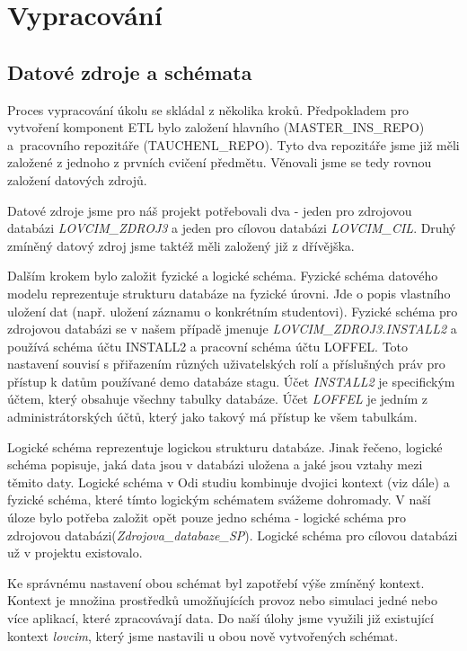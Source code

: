 \section{Vypracování}

 \subsection{Datové zdroje a schémata}
 \par Proces vypracování úkolu se skládal z několika kroků. Předpokladem pro 
 vytvoření komponent ETL bylo založení hlavního (MASTER\_INS\_REPO) a~pracovního repozitáře (TAUCHENL\_REPO). Tyto dva repozitáře jsme již měli založené z jednoho z prvních cvičení předmětu.  Věnovali jsme se tedy rovnou založení datových zdrojů. 
 
 \par  Datové zdroje jsme pro náš projekt potřebovali dva - jeden pro zdrojovou databázi \textit{LOVCIM\_ZDROJ3} a jeden pro cílovou databázi \textit{LOVCIM\_CIL}. Druhý zmíněný datový zdroj jsme taktéž měli založený již z dřívějška. 
 
  \par Dalším krokem bylo založit fyzické a logické schéma. Fyzické schéma datového modelu reprezentuje strukturu databáze na fyzické úrovni. Jde o popis
 vlastního uložení dat (např. uložení záznamu o konkrétním studentovi). Fyzické schéma pro zdrojovou databázi se v našem případě jmenuje \textit{LOVCIM\_ZDROJ3.INSTALL2} a používá schéma účtu INSTALL2 a pracovní schéma účtu LOFFEL. Toto nastavení souvisí s přiřazením různých uživatelských rolí a příslušných práv pro přístup k datům používané demo databáze stagu. Účet \textit{INSTALL2} je specifickým účtem, který obsahuje všechny tabulky databáze. Účet \textit{LOFFEL} je jedním z administrátorských účtů, který jako takový má přístup ke všem tabulkám. 
 
  \par Logické schéma reprezentuje logickou strukturu databáze. Jinak řečeno, logické schéma popisuje, jaká data jsou v databázi uložena a jaké jsou vztahy mezi těmito daty. Logické schéma v Odi studiu kombinuje dvojici kontext (viz dále) a fyzické schéma, které tímto logickým schématem svážeme dohromady. V naší úloze bylo potřeba založit opět pouze jedno schéma - logické schéma pro zdrojovou databázi(\textit{Zdrojova\_databaze\_SP}). Logické schéma pro cílovou databázi už v projektu existovalo. 
 
  \par Ke správnému nastavení obou schémat byl zapotřebí výše zmíněný kontext. Kontext je množina prostředků umožňujících provoz nebo simulaci jedné nebo více aplikací, které zpracovávají data. Do naší úlohy jsme využili již existující kontext \textit{lovcim}, který jsme nastavili u obou nově vytvořených schémat. 
 
